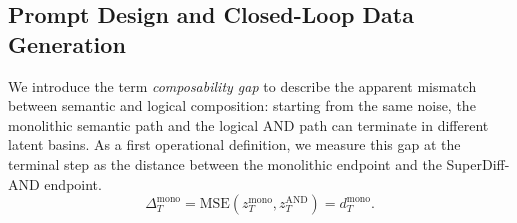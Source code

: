 

\subsection{Prompt Design and Closed-Loop Data Generation}
\label{sec:inversion}

We introduce the term \emph{composability gap} to describe the apparent mismatch between semantic and logical composition: starting from the same noise, the monolithic semantic path and the logical AND path can terminate in different latent basins. As a first operational definition, we measure this gap at the terminal step as the distance between the monolithic endpoint and the SuperDiff-AND endpoint.
\begin{equation}
    \Delta_T^{\mathrm{mono}}
    =
    \mathrm{MSE}\!\left(z_T^{\mathrm{mono}}, z_T^{\mathrm{AND}}\right)
    =
    d_T^{\mathrm{mono}}.
    \label{eq:gap}
\end{equation}

